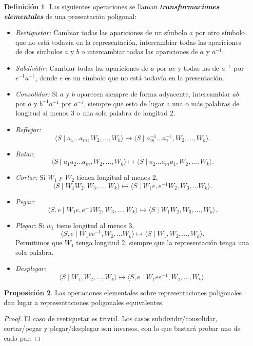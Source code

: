 \documentclass[10pt]{report}
\newcommand{\enfatiza}[1]{\textbf{\textit{#1}}}
\theoremstyle{definition}
\newtheorem{defin}{Definición}[section]
\newtheorem{prop}[defin]{Proposición}
\begin{document}
\begin{defin}%
Las siguientes operaciones se llaman \enfatiza{transformaciones elementales} de una presentación poligonal:
\begin{itemize}
\item \textit{Reetiquetar:} Cambiar todas las apariciones de un símbolo $a$ por otro símbolo que no está todavía en la representación, intercambiar todas las apariciones de dos símbolos $a$ y $b$ o intercambiar todas las apariciones de $a$ y $a^{-1}$.
\item \textit{Subdividir:} Cambiar todas las apariciones de $a$ por $ae$ y todas las de $a^{-1}$ por $e^{-1}a^{-1}$, donde $e$ es un símbolo que no está todavía en la presentación.
\item \textit{Consolidar:} Si $a$ y $b$ aparecen siempre de forma adyacente, intercambiar $ab$ por $a$ y $b^{-1}a^{-1}$ por $a^{-1}$, siempre que esto de lugar a una o más palabras de longitud al menos $3$ o una sola palabra de longitud $2$.
\item \textit{Reflejar:} $$\langle S\mid   a_1 \dots a_m, W_2,\dots,W_k\rangle \mapsto \langle S\mid   a_m^{-1}\dots a_1^{-1}, W_2, \dots ,W_k\rangle .$$
\item \textit{Rotar:} $$\langle S\mid a_1a_2\dots a_m, W_2,\dots , W_k\rangle \mapsto \langle S\mid   a_2\dots a_ma_1, W_2,\dots , W_k\rangle .$$
\item \textit{Cortar:} Si $W_1$ y $W_2$ tienen longitud al menos $2$, $$\langle S\mid W_1W_2, W_3,\dots , W_k\rangle \mapsto \langle S\mid W_1e, e^{-1}W_2, W_3,\dots W_k\rangle .$$
\item \textit{Pegar:} $$\langle S,e\mid W_1e, e^-1W_2, W_3,\dots , W_k\rangle \mapsto \langle S\mid W_1W_2, W_3,\dots , W_k\rangle .$$
\item \textit{Plegar:} Si $w_1$ tiene longitud al menos $3$, $$\langle S,e\mid W_1ee^{-1}, W_2,\dots W_k\rangle \mapsto \langle S\mid W_1, W_2,\dots , W_k\rangle .$$ Permitimos que $W_1$ tenga longitud $2$, siempre que la representación tenga una sola palabra.
\item \textit{Desplegar:} $$\langle S\mid W_1, W_2,\dots , W_k\rangle \mapsto \langle S,e\mid W_1ee^{-1}, W_2,\dots , W_k\rangle .$$
\end{itemize}
\end{defin}


\begin{prop}%
Las operaciones elementales sobre representaciones poligonales dan lugar a representaciones poligonales equivalentes.
\end{prop}
\begin{proof}
El caso de reetiquetar es trivial. Los casos subdividir/consolidar, cortar/pegar y plegar/desplegar son inversos, con lo que bastará probar uno de cada par.  
\end{proof}
\end{document}
